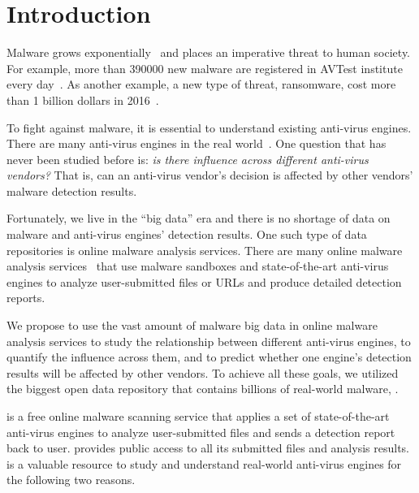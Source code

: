 \vspace{-0.05in}
\section{Introduction}
\label{sec:intro}

Malware grows exponentially~\cite{avtest} and places an imperative threat to human society. 
For example, more than 390000 new malware are registered in AVTest institute every day~\cite{avtest}.
As another example, a new type of threat, ransomware, cost more than 1 billion dollars in 2016~\cite{ransomware}. 

To fight against malware, it is essential to understand existing anti-virus engines.
There are many anti-virus engines in the real world~\cite{virustotal}.
One question that has never been studied before is: 
{\em is there influence across different anti-virus vendors?}
That is, can an anti-virus vendor's decision is affected 
by other vendors' malware detection results. 

Fortunately, we live in the ``big data'' era and there is no shortage of data on malware 
and anti-virus engines' detection results. 
One such type of data repositories is online malware analysis services. 
There are many online malware analysis services~\cite{virustotal,malwr,vxstream,anubis} 
that use malware sandboxes and state-of-the-art
anti-virus engines to analyze user-submitted files 
or URLs and produce detailed detection reports. 

We propose to use the vast amount of malware big data in online malware analysis services 
to study the relationship between different anti-virus engines, 
to quantify the influence across them, 
and to predict whether one engine's detection results will be affected by other vendors. 
To achieve all these goals, we utilized the biggest open data repository
that contains billions of real-world malware, {\em \vt}.

\vt{} is a free online malware scanning service
that applies a set of state-of-the-art anti-virus engines to analyze user-submitted files 
and sends a detection report back to user.
\vt{} provides public access to all its submitted files and analysis results. 
\vt{} is a valuable resource to study and 
understand real-world anti-virus engines for the following two reasons. 

